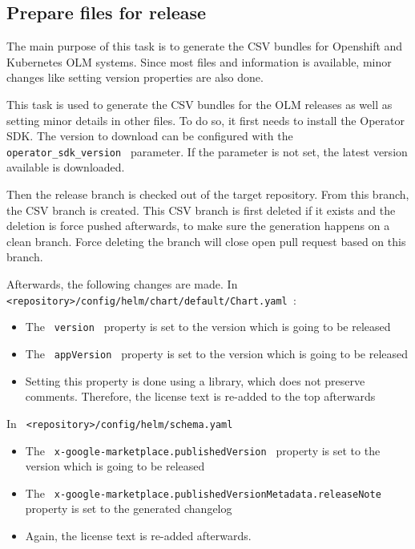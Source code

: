 \subsection{Prepare files for release}\label{subsec:prepare-files-for-release}

The main purpose of this task is to generate the CSV bundles for Openshift and Kubernetes OLM systems.
Since most files and information is available, minor changes like setting version properties are also done.

This task is used to generate the CSV bundles for the OLM releases as well as setting minor details in other files.
To do so, it first needs to install the Operator SDK.
The version to download can be configured with the \verb| operator_sdk_version | parameter.
If the parameter is not set, the latest version available is downloaded.

Then the release branch is checked out of the target repository.
From this branch, the CSV branch is created.
This CSV branch is first deleted if it exists and the deletion is force pushed afterwards, to make sure the generation happens on a clean branch.
Force deleting the branch will close open pull request based on this branch.

Afterwards, the following changes are made.
In \verb| <repository>/config/helm/chart/default/Chart.yaml |:
\begin{itemize}
    \item The \verb| version | property is set to the version which is going to be released
    \item The \verb| appVersion | property is set to the version which is going to be released
    \item Setting this property is done using a library, which does not preserve comments. Therefore, the license text is re-added to the top afterwards
\end{itemize}

In \verb| <repository>/config/helm/schema.yaml |
\begin{itemize}
    \item The \verb| x-google-marketplace.publishedVersion | property is set to the version which is going to be released
    \item The \verb| x-google-marketplace.publishedVersionMetadata.releaseNote | property is set to the generated changelog
    \item Again, the license text is re-added afterwards.
\end{itemize}

